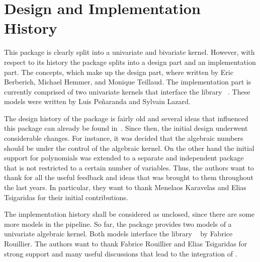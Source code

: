 \section{Design and Implementation History}

This package is clearly split into a univariate and bivariate kernel.
However, with respect to its history the package splits into a
design part and an implementation part.  The concepts, which make
up the design part, where written by Eric Berberich, Michael Hemmer,
and Monique Teillaud. The implementation part is currently comprised
of two univariate kernels that interface the library \rs~\cite{cgal:r-rs}.
These models were written by Luis Pe\~{n}aranda and Sylvain Lazard.

The design history of the package is fairly old and several ideas
that influenced this package can already be found
in~\cite{cgal:bhkt-risak-07}. Since then, the initial design underwent
considerable changes. For instance, it was decided that the algebraic
numbers should be under the control of the algebraic kernel. On the
other hand the initial support for polynomials was extended to a
separate and independent package that is not restricted to a certain
number of variables. Thus, the authors want to thank for all the
useful feedback and ideas that was brought to them throughout the
last years. In particular, they want to thank Menelaos Karavelas
and Elias Tsigaridas for their initial contributions.


The implementation history shall be considered as unclosed, since
there are some more models in the pipeline. So far, the package
provides two models of a univariate algebraic kernel. Both models
interface the library \rs~\cite{cgal:r-rs} by Fabrice Rouillier.
The authors want to thank Fabrice Rouillier and Elias Tsigaridas
for strong support and many useful discussions that lead to the
integration of \rs.
